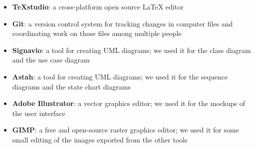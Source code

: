 \begin{itemize}
\item \textbf{TeXstudio}: a cross-platform open source LaTeX editor
\item \textbf{Git}: a version control system for tracking changes in computer files and coordinating work on those files among multiple people
\item \textbf{Signavio}: a tool for creating UML diagrams; we used it for the class diagram and the use case diagram
\item \textbf{Astah}: a tool for creating UML diagrams; we used it for the sequence diagrams and the state chart diagrams
\item \textbf{Adobe Illustrator}: a vector graphics editor; we used it for the mockups of the user interface
\item \textbf{GIMP}: a free and open-source raster graphics editor; we used it for some small editing of the images exported from the other tools
\end{itemize}